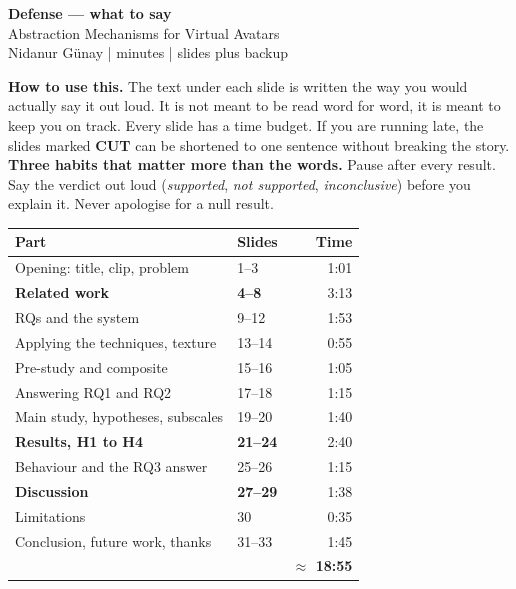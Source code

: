 \documentclass[11pt,a4paper]{article}
\begin{document}
\begin{center}
  {\LARGE\bfseries\color{knblue} Defense — what to say}\\[0.4em]
  {\large Abstraction Mechanisms for Virtual Avatars}\\[0.3em]
  {\color{kngrey} Nidanur Günay \quad| minutes \quad| slides plus backup}
\end{center}

\vspace{0.6em}

\noindent\colorbox{knlight}{\parbox{0.972\textwidth}{\small\color{knblue}
\textbf{How to use this.} The text under each slide is written the way you would actually say it out loud. It is not meant to be read word for word, it is meant to keep you on track. Every slide has a time budget. If you are running late, the slides marked \textbf{CUT} can be shortened to one sentence without breaking the story.\\[0.4em]
\textbf{Three habits that matter more than the words.} Pause after every result. Say the verdict out loud (\emph{supported}, \emph{not supported}, \emph{inconclusive}) before you explain it. Never apologise for a null result.}}

\vspace{0.9em}

\begin{center}
\begin{tabular}{@{}llr@{}}
\toprule
\textbf{Part} & \textbf{Slides} & \textbf{Time} \\
\midrule
Opening: title, clip, problem & 1--3 & 1:01 \\
\textbf{Related work} & \textbf{4--8} & 3:13 \\
RQs and the system & 9--12 & 1:53 \\
Applying the techniques, texture & 13--14 & 0:55 \\
Pre-study and composite & 15--16 & 1:05 \\
Answering RQ1 and RQ2 & 17--18 & 1:15 \\
Main study, hypotheses, subscales & 19--20 & 1:40 \\
\textbf{Results, H1 to H4} & \textbf{21--24} & 2:40 \\
Behaviour and the RQ3 answer & 25--26 & 1:15 \\
\textbf{Discussion} & \textbf{27--29} & 1:38 \\
Limitations & 30 & 0:35 \\
Conclusion, future work, thanks & 31--33 & 1:45 \\
\midrule
& & \textbf{$\approx$ 18:55} \\
\bottomrule
\end{tabular}
\end{center}
\end{document}

